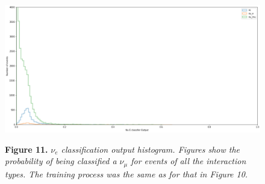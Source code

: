 \begin{figure}[t!]
 \centering
 \includegraphics[width=160mm]{genie/NUE.png}
 
 \textbf{Figure 11.} \textit{$\nu_e$ classification output histogram. Figures show the probability of being classified a $\nu_\mu$ for events of all the interaction types. The training process was the same as for that in Figure 10.}
\end{figure}



